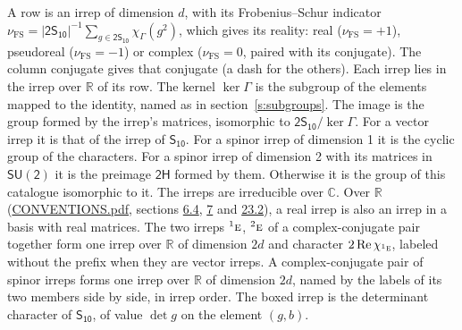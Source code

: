 \documentclass[10pt,a4paper]{article}
\numberwithin{equation}{section}
\newcommand{\grp}[1]{\mathsf{#1}}
\newcommand{\irr}[1]{\text{\normalfont\scshape #1}}
\newcommand{\conjpair}[1]{{}^{#1}}
\newcommand{\irchar}[1]{\chi_{#1}}
\newcommand{\fsind}{\nu_{\mathrm{FS}}}
\begin{document}
\leavevmode\label{n:index.frobenius}\label{n:head.irrep}\label{n:head.reality}A row is an irrep of dimension $d$, with its Frobenius--Schur indicator $\fsind = |\grp{2S_{10}}|^{-1}\allowbreak\sum_{g\in\grp{2S_{10}}}\irchar{\Gamma}(g^2)$, which gives its reality: real ($\fsind = +1$), pseudoreal ($\fsind = -1$) or complex ($\fsind = 0$, paired with its conjugate). \label{n:head.conjugate}The column conjugate gives that conjugate (a dash for the others). \label{n:head.over.real}Each irrep lies in the irrep over $\mathbb{R}$ of its row. \label{n:head.kernel}The kernel $\ker\Gamma$ is the subgroup of the elements mapped to the identity, named as in section~\ref{s:subgroups}. \label{n:head.image}The image is the group formed by the irrep's matrices, isomorphic to $\grp{2S_{10}}/\ker\Gamma$. For a vector irrep it is that of the irrep of \href{../../../rotation/data/pdf/S10.pdf}{$\grp{S_{10}}$}. For a spinor irrep of dimension 1 it is the cyclic group of the characters. For a spinor irrep of dimension 2 with its matrices in $\grp{SU(2)}$ it is the preimage $\grp{2H}$ formed by them. Otherwise it is the group of this catalogue isomorphic to it. The irreps are irreducible over $\mathbb{C}$. Over $\mathbb{R}$ (\href{../../CONVENTIONS.pdf}{CONVENTIONS.pdf}, sections \href{../../../rotation/CONVENTIONS.pdf\#conv.6.4}{6.4}, \href{../../../rotation/CONVENTIONS.pdf\#conv.7}{7} and \href{../../CONVENTIONS.pdf\#conv.23.2}{23.2}), a real irrep is also an irrep in a basis with real matrices. The two irreps $\conjpair{1}\irr{e}$, $\conjpair{2}\irr{e}$ of a complex-conjugate pair together form one irrep over $\mathbb{R}$ of dimension $2d$ and character $2\operatorname{Re}\irchar{\conjpair{1}\irr{e}}$, labeled without the prefix when they are vector irreps. A complex-conjugate pair of spinor irreps forms one irrep over $\mathbb{R}$ of dimension $2d$, named by the labels of its two members side by side, in irrep order. \label{n:mark.determinant}The boxed irrep is the determinant character of \href{../../../rotation/data/pdf/S10.pdf}{$\grp{S_{10}}$}, of value $\det g$ on the element $(g, b)$.
\setlength{\emergencystretch}{2em}\par\setlength{\emergencystretch}{0pt}
\end{document}
